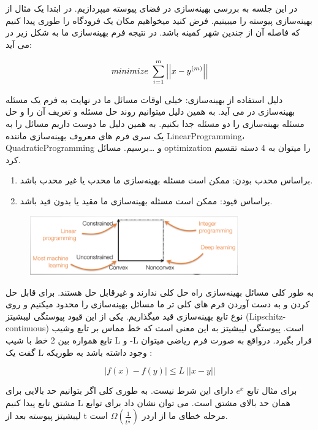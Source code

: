 \begin{flushright}
    در این جلسه به بررسی بهینه‌سازی در فضای پیوسته میپردازیم.
    در ابتدا یک مثال از بهینه‌سازی پیوسته را میبینیم.
    فرض کنید میخواهیم مکان یک فرودگاه را طوری پیدا کنیم که فاصله آن از چندین شهر کمینه باشد.
    در نتیجه فرم بهینه‌سازی ما به شکل زیر در می آید:

    \begin{displaymath}
        \centering
        minimize\ \sum_{i=1}^{m}\left|\left|x-y^{\left(m\right)}\right|\right|
    \end{displaymath}

    دلیل استفاده از بهینه‌سازی:
    خیلی اوقات مسائل ما در نهایت به فرم یک مسئله بهینه‌سازی در می آید.
    به همین دلیل میتوانیم روند حل مسئله و تعریف آن را و حل مسئله بهینه‌سازی را دو مسئله جدا بکنیم.
    به همین دلیل ما دوست داریم مسائل را به یک سری فرم های معروف بهینه‌سازی ماننده LinearProgramming، QuadraticProgramming و \ldots برسیم.
    مسائل optimization را میتوان به 4 دسته تقسیم کرد.
    \begin{enumerate}
        \item براساس محدب بودن: ممکن است مسئله بهینه‌سازی ما محدب یا غیر محدب باشد.
        \item براساس قیود: ممکن است مسئله بهینه‌سازی ما مقید یا بدون قید باشد.
    \end{enumerate}

    \begin{figure}[H]
        \centering
        \includegraphics[width=0.8\textwidth]{source/opt-types.png}
        \label{fig:optimization}
    \end{figure}

    به طور کلی مسائل بهینه‌سازی راه حل کلی ندارند و غیرقابل حل هستند.
    برای قابل حل کردن و به دست آوردن فرم های کلی تر ما مسائل بهینه‌سازی را محدود میکنیم و روی نوع تابع بهینه‌سازی قید میگذاریم.
    یکی از این قیود پیوستگی لیبشیتز (Lipschitz-continuous) است.
    پیوستگی لیبشیتز به این معنی است که خط مماس بر تابع وشیب تابع همواره بین 2 خط با شیب L و -L قرار بگیرد.
    درواقع به صورت فرم ریاضی میتوان گفت یک L وجود داشته باشد به طوریکه :

    \begin{displaymath}
        \left|f\left(x\right)-f\left(y\right)\right|\le L\ |\left|x-y\right||
    \end{displaymath}

    برای مثال تابع $e^x$ دارای این شرط نیست.
    به طوری کلی اگر بتوانیم حد بالایی برای مشتق تابع پیدا کنیم L همان حد بالای مشتق است.
    می توان نشان داد برای توابع لیبشیتز پیوسته بعد از t مرحله خطای ما از اردر $\Omega(\frac{1}{t^\frac{1}{n}})$  است.

\end{flushright}
